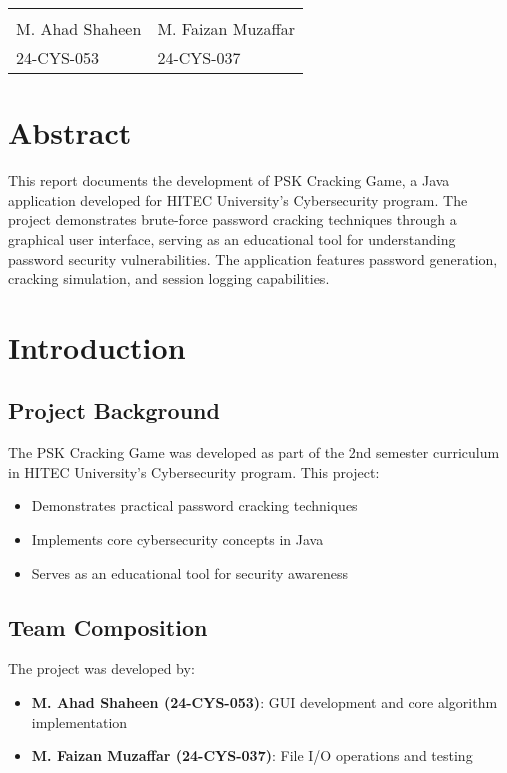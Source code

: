 \documentclass[12pt,a4paper]{report}
\begin{document}
\vspace{1cm}
\begin{tabular}{ll}
\hspace{5cm} & \hspace{5cm} \\
\cline{1-1} \cline{2-2}
M. Ahad Shaheen & M. Faizan Muzaffar \\
24-CYS-053 & 24-CYS-037 \\
\end{tabular}

\tableofcontents
\newpage

\chapter*{Abstract}
This report documents the development of PSK Cracking Game, a Java application developed for HITEC University's Cybersecurity program. The project demonstrates brute-force password cracking techniques through a graphical user interface, serving as an educational tool for understanding password security vulnerabilities. The application features password generation, cracking simulation, and session logging capabilities.

\chapter{Introduction}
\section{Project Background}
The PSK Cracking Game was developed as part of the 2nd semester curriculum in HITEC University's Cybersecurity program. This project:

\begin{itemize}
    \item Demonstrates practical password cracking techniques
    \item Implements core cybersecurity concepts in Java
    \item Serves as an educational tool for security awareness
\end{itemize}

\section{Team Composition}
The project was developed by:
\begin{itemize}
    \item \textbf{M. Ahad Shaheen (24-CYS-053)}: GUI development and core algorithm implementation
    \item \textbf{M. Faizan Muzaffar (24-CYS-037)}: File I/O operations and testing
\end{itemize}
\end{document}
